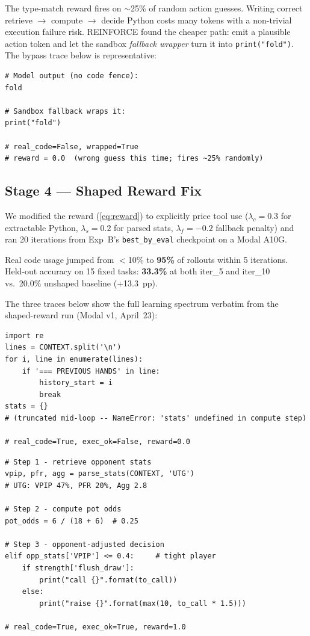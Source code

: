 \documentclass{article}
\begin{document}
The type-match reward fires on $\sim$25\% of random action guesses.
Writing correct retrieve $\to$ compute $\to$ decide Python costs many
tokens with a non-trivial execution failure risk.
REINFORCE found the cheaper path: emit a plausible action token and let
the sandbox \emph{fallback wrapper} turn it into \texttt{print("fold")}.
The bypass trace below is representative:

\begin{lstlisting}[caption={Sample 1 — The shortcut (reward hack): model emits bare text, earns code bonus without any reasoning.}]
# Model output (no code fence):
fold

# Sandbox fallback wraps it:
print("fold")

# real_code=False, wrapped=True
# reward = 0.0  (wrong guess this time; fires ~25% randomly)
\end{lstlisting}

\subsection{Stage 4 — Shaped Reward Fix}

We modified the reward (\cref{eq:reward}) to explicitly price tool use
($\lambda_c{=}0.3$ for extractable Python, $\lambda_s{=}0.2$ for parsed
stats, $\lambda_f{=}{-}0.2$ fallback penalty) and ran 20 iterations from
Exp~B's \texttt{best\_by\_eval} checkpoint on a Modal A10G.

Real code usage jumped from $<$10\% to \textbf{95\%} of rollouts within
5 iterations.
Held-out accuracy on 15 fixed tasks: \textbf{33.3\%} at both iter\_5
and iter\_10 vs.\ 20.0\% unshaped baseline (+13.3~pp).

The three traces below show the full learning spectrum verbatim from the
shaped-reward run (Modal v1, April~23):

\begin{lstlisting}[caption={Sample 2 — The attempt: real code extracted but crashes at runtime (iter~3).}]
import re
lines = CONTEXT.split('\n')
for i, line in enumerate(lines):
    if '=== PREVIOUS HANDS' in line:
        history_start = i
        break
stats = {}
# (truncated mid-loop -- NameError: 'stats' undefined in compute step)

# real_code=True, exec_ok=False, reward=0.0
\end{lstlisting}

\begin{lstlisting}[caption={Sample 3 — Full retrieve$\to$compute$\to$decide reasoning (iter~5).}]
# Step 1 - retrieve opponent stats
vpip, pfr, agg = parse_stats(CONTEXT, 'UTG')
# UTG: VPIP 47%, PFR 20%, Agg 2.8

# Step 2 - compute pot odds
pot_odds = 6 / (18 + 6)  # 0.25

# Step 3 - opponent-adjusted decision
elif opp_stats['VPIP'] <= 0.4:     # tight player
    if strength['flush_draw']:
        print("call {}".format(to_call))
    else:
        print("raise {}".format(max(10, to_call * 1.5)))

# real_code=True, exec_ok=True, reward=1.0
\end{lstlisting}
\end{document}
